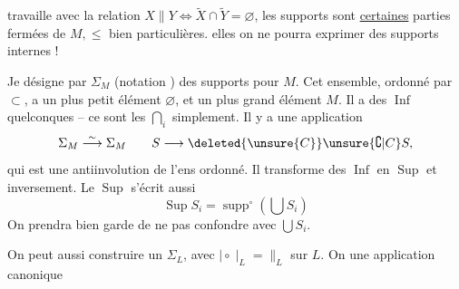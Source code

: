 
travaille avec la relation $X\mathrel{\|}Y\Longleftrightarrow\widetilde{X}\cap\widetilde{Y}=\varnothing$, les supports sont \uline{certaines} parties fermées de $M,\leq$ bien particulières.  elles on ne pourra exprimer des supports internes !

Je désigne par $\Sigma_M$ (notation )  des supports pour $M$.  Cet ensemble,  ordonné par $\subset$, a un plus petit élément $\varnothing$, et un plus grand élément $M$. Il a des $\operatorname{Inf}$ quelconques -- ce sont les $\bigcap_i$ simplement. Il y a une  application
\[
\Sigma_M\overset{\sim}{\longrightarrow}\Sigma_M\qquad S\longrightarrow\deleted{\unsure{C}}\unsure{\complement|C}S,
\]
qui est une antiinvolution de l'ens ordonné. Il  transforme des $\operatorname{Inf}$ en $\operatorname{Sup}$ et inversement. Le $\operatorname{Sup}$ s'écrit aussi
\[
\operatorname{Sup}S_i=\operatorname{supp}^{\circ}(\textstyle\bigcup S_i)
\]
On prendra bien garde de ne pas  confondre avec $\bigcup S_i$.

On peut aussi construire un $\Sigma_L$, avec $\mid\circ\mid_L=\mathrel{\|}_L$ sur $L$. On  une application canonique
